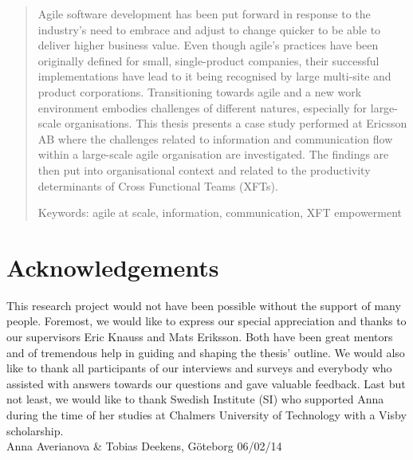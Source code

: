 \begin{abstract}

Agile software development has been put forward in response to the industry's need to embrace and adjust to change quicker to be able to deliver higher business value. Even though agile's practices have been originally defined for small, single-product companies, their successful implementations have lead to it being recognised by large multi-site and product corporations. Transitioning towards agile and a new work environment embodies challenges of different natures, especially for large-scale organisations. This thesis presents a case study performed at Ericsson AB where the challenges related to information and communication flow within a large-scale agile organisation are investigated. The findings are then put into organisational context and related to the productivity determinants of Cross Functional Teams (XFTs).

Keywords: agile at scale, information, communication, XFT empowerment

\end{abstract}

\newpage
\clearpage

\thispagestyle{empty}

\section*{Acknowledgements}

This research project would not have been possible without the support of many people. Foremost, we would like to express our special appreciation and thanks to our supervisors Eric Knauss and Mats Eriksson. Both have been great mentors and of tremendous help in guiding and shaping the thesis' outline. We would also like to thank all participants of our interviews and surveys and everybody who assisted with answers towards our questions and gave valuable feedback. Last but not least, we would like to thank Swedish Institute (SI) who supported Anna during the time of her studies at Chalmers University of Technology with a Visby scholarship.
 \\[1cm]

\hfill Anna Averianova \& Tobias Deekens, Göteborg 06/02/14
